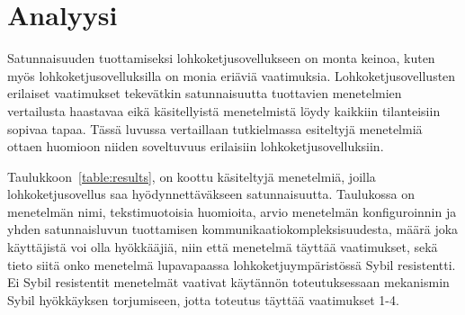 \chapter{Analyysi\label{discussion}}

Satunnaisuuden tuottamiseksi lohkoketjusovellukseen on monta keinoa, kuten myös lohkoketjusovelluksilla on monia eriäviä vaatimuksia. Lohkoketjusovellusten erilaiset vaatimukset tekevätkin satunnaisuutta tuottavien menetelmien vertailusta haastavaa eikä käsitellyistä menetelmistä löydy kaikkiin tilanteisiin sopivaa tapaa. Tässä luvussa vertaillaan tutkielmassa esiteltyjä menetelmiä ottaen huomioon niiden soveltuvuus erilaisiin lohkoketjusovelluksiin.

Taulukkoon~\ref{table:results}, on koottu käsiteltyjä menetelmiä, joilla lohkoketjusovellus saa hyödynnettäväkseen satunnaisuutta. Taulukossa on menetelmän nimi, tekstimuotoisia huomioita, arvio menetelmän konfiguroinnin ja yhden satunnaisluvun tuottamisen kommunikaatiokompleksisuudesta, määrä joka käyttäjistä voi olla hyökkääjiä, niin että menetelmä täyttää vaatimukset, sekä tieto siitä onko menetelmä lupavapaassa lohkoketjuympäristössä Sybil resistentti. Ei Sybil resistentit menetelmät vaativat käytännön toteutuksessaan mekanismin Sybil hyökkäyksen torjumiseen, jotta toteutus täyttää vaatimukset 1-4.

